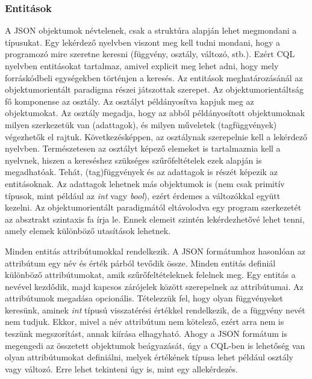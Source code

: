 \documentclass[a4paper,12pt]{report}
\begin{document}
\subsubsection{Entitások}
A JSON objektumok névtelenek, csak a struktúra alapján lehet megmondani a típusukat. Egy lekérdező nyelvben viszont meg kell tudni mondani, hogy a programozó mire szeretne keresni (függvény, osztály, változó, stb.). Ezért CQL nyelvben entitásokat tartalmaz, amivel explicit meg lehet adni, hogy mely forráskódbeli egységekben történjen a keresés. Az entitások meghatározásánál az objektumorientált paradigma részei játszottak szerepet. Az objektumorientáltság fő komponense az osztály. Az osztályt példányosítva kapjuk meg az objektumokat. Az osztály megadja, hogy az abból példányosított objektumoknak milyen szerkezetük van (adattagok), és milyen műveletek (tagfüggvények) végezhetők el rajtuk. Következésképpen, az osztálynak szerepelnie kell a lekérdező nyelvben. Természetesen az osztályt képező elemeket is tartalmaznia kell a nyelvnek, hiszen a kereséshez szükséges szűrőfeltételek ezek alapján is megadhatóak. Tehát, (tag)függvények és az adattagok is részét képezik az entitásoknak. Az adattagok lehetnek más objektumok is (nem csak primitív típusok, mint például az \textit{int} vagy \textit{bool}), ezért érdemes a változókkal együtt kezelni. Az objektumorientált paradigmától eltávolodva egy program szerkezetét az absztrakt szintaxis fa írja le. Ennek elemeit szintén lekérdezhetővé lehet tenni, amely elemek különböző utasítások lehetnek.
\par Minden entitás attribútumokkal rendelkezik. A JSON formátumhoz hasonlóan az attribútum egy név és érték párból tevődik össze. Minden entitás definiál különböző attribútumokat, amik szűrőfeltételeknek felelnek meg. Egy entitás a nevével kezdődik, majd kapcsos zárójelek között szerepelnek az attribútumai. Az attribútumok megadása opcionális. Tételezzük fel, hogy olyan függvényeket keresünk, aminek \textit{int} típusú visszatérési értékkel rendelkezik, de a függvény nevét nem tudjuk. Ekkor, mivel a név attribútum nem kötelező, ezért arra nem is teszünk megszorítást, annak kiírása elhagyható. Ahogy a JSON formátum is megengedi az összetett objektumok beágyazását, úgy a CQL-ben is lehetőség van olyan attribútumokat definiálni, melyek értékének típusa lehet például osztály vagy változó. Erre lehet tekinteni úgy is, mint egy allekérdezés. 
\end{document}
